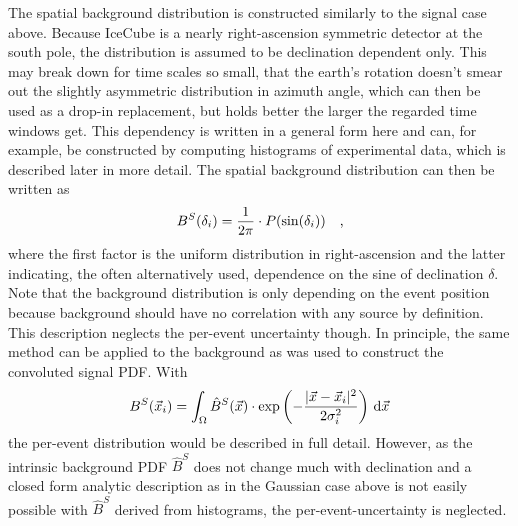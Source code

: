The spatial background distribution is constructed similarly to the signal case above.
Because IceCube is a nearly right-ascension symmetric detector at the south pole, the distribution is assumed to be declination dependent only.
This may break down for time scales so small, that the earth's rotation doesn't smear out the slightly asymmetric distribution in azimuth angle, which can then be used as a drop-in replacement, but holds better the larger the regarded time windows get.
This dependency is written in a general form here and can, for example, be constructed by computing histograms of experimental data, which is described later in more detail.
The spatial background distribution can then be written as
\begin{equation}
  B^S(\delta_i) = \frac{1}{2\pi} \cdot P(\sin(\delta_i))
  \quad\text{,}
\end{equation}
where the first factor is the uniform distribution in right-ascension and the latter indicating, the often alternatively used, dependence on the sine of declination $\delta$.
Note that the background distribution is only depending on the event position because background should have no correlation with any source by definition.
This description neglects the per-event uncertainty though.
In principle, the same method can be applied to the background as was used to construct the convoluted signal PDF.
With
\begin{equation}
  B^S(\vec{x}_i) =
    \int_\Omega \hat{B}^S(\vec{x}) \cdot
      \exp\left(-\frac{|\vec{x}-\vec{x}_i|^2}{2\sigma_i^2}\right)
      \,\mathrm{d}\vec{x}
\end{equation}
the per-event distribution would be described in full detail.
However, as the intrinsic background PDF $\hat{B}^S$ does not change much with declination and a closed form analytic description as in the Gaussian case above is not easily possible with $\hat{B}^S$ derived from histograms, the per-event-uncertainty is neglected.


